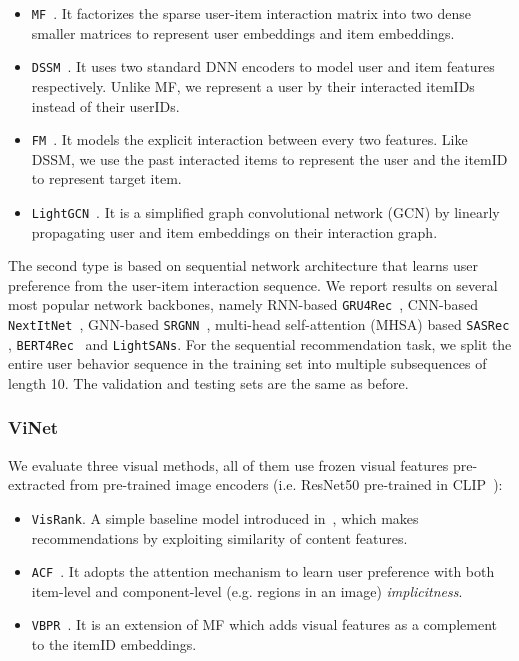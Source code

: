 \documentclass[sigconf]{acmart}
\begin{document}
\begin{itemize}
	\item \texttt{MF}~\cite{rendle2012bpr}. It factorizes the sparse user-item interaction matrix into two dense smaller matrices to represent user embeddings and item embeddings.
	\item \texttt{DSSM}~\cite{huang2013learning}. It uses two standard DNN encoders to model user and item features respectively. Unlike MF, we represent a user by their interacted itemIDs instead of their userIDs.
	
	\item \texttt{FM}~\cite{rendle2010factorization}. It  models  the explicit interaction between every two features. Like DSSM, we  use the  past interacted items to represent the user and the itemID to represent target item.	
 
	\item \texttt{LightGCN}~\cite{he2020lightgcn}. It is a simplified graph convolutional network (GCN) by linearly propagating user and item embeddings on their interaction graph.

	
\end{itemize}

The second type is based on sequential network architecture that learns user preference from the user-item interaction sequence. We report results on several most popular network backbones, namely RNN-based \texttt{GRU4Rec}~\cite{hidasi2015session},  CNN-based 
\texttt{NextItNet}~\cite{yuan2019simple}, GNN-based \texttt{SRGNN}~\cite{wu2019session}, 
multi-head self-attention (MHSA) based   \texttt{SASRec} \cite{kang2018self}, \texttt{BERT4Rec}~\cite{sun2019bert4rec} and  \texttt{LightSANs}\cite{fan2021lighter}. For the sequential recommendation task, we split the entire user behavior sequence in the training set into multiple subsequences of length 10. The validation and testing sets are  the same as before.
 

\subsubsection{ViNet}
We evaluate three visual methods, all of them use frozen visual features pre-extracted from pre-trained image encoders (i.e. ResNet50 pre-trained in CLIP~\cite{radford2021learning}):
\begin{itemize}
	\item \texttt{VisRank}.  A simple baseline model introduced in~\cite{kang2017visually}, which makes recommendations by exploiting
	similarity of content features.


	\item \texttt{ACF}~\cite{chen2017attentive}. It adopts the attention mechanism to learn user preference  with both item-level and component-level (e.g. regions in an image) \textit{implicitness}. 


	\item \texttt{VBPR}~\cite{he2016vbpr}. It is an extension of MF which adds visual features as a complement to the itemID embeddings.  
\end{itemize}
\end{document}
